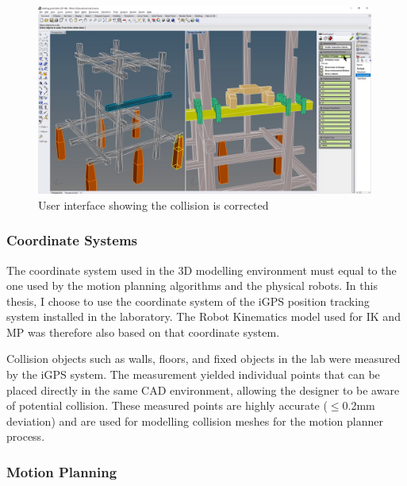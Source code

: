 \begin{figure}[!h]
    \centering
    \includegraphics[width=0.99\textwidth]{images/05/image8.png}
    \caption{User interface showing the collision is corrected}
    \label{fig:user-interface-collision-corrected}
\end{figure}

\FloatBarrier

\subsubsection{Coordinate Systems}
\label{subsubsection:exploration-2-coordinate-systems}

The coordinate system used in the 3D modelling environment must equal to the one used by the motion planning algorithms and the physical robots. In this thesis, I choose to use the coordinate system of the iGPS position tracking system \parencite{stadelmannEndEffectorPoseCorrection2019} installed in the laboratory. The Robot Kinematics model used for IK and MP was therefore also based on that coordinate system. 

Collision objects such as walls, floors, and fixed objects in the lab were measured by the iGPS system. The measurement yielded individual points that can be placed directly in the same CAD environment, allowing the designer to be aware of potential collision. These measured points are highly accurate ($\le$0.2mm deviation) and are used for modelling collision meshes for the motion planner process.

\subsubsection{Motion Planning}
\label{subsubsection:exploration-2-motion-planning}

